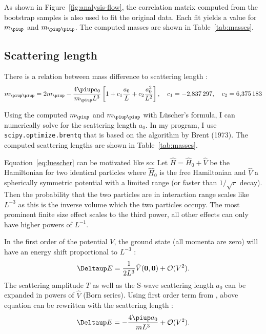 \documentclass[11pt, english, fleqn, DIV=10, headinclude]{scrartcl}
\newcommand\mpi{m_{\piup}}
\newcommand\mpipi{m_{\piup\piup}}
\begin{document}
As shown in Figure~\ref{fig:analysis-flow}, the correlation matrix computed from
the bootstrap samples is also used to fit the original data. Each fit yields a
value for $\mpi$ and $\mpipi$. The computed masses are shown in
Table~\ref{tab:masses}.

\subsection{Scattering length}
\label{sec:scattering_length}

There is a relation between mass difference to scattering length
\parencite[(1.3)]{luescher/volume_dependence}:
\begin{equation}
    \label{eq:luescher}
    \mpipi = 2\mpi - \frac{4 \piup a_0}{\mpi L^3} \sbr{1 + c_1 \frac{a_0}L + c_2 \frac{a_0^2}{L^2}}
    \eqnsep
    c_1 = \num{-2.837297}
    \eqnsep
    c_2 = \num{6.375183}
\end{equation}

Using the computed $\mpi$ and $\mpipi$ with Lüscher's formula, I can
numerically solve for the scattering length $a_0$. In my program, I use
\texttt{scipy.optimize.brentq} that is based on the algorithm by Brent (1973).
The computed scattering lengths are shown in Table~\ref{tab:masses}.

Equation~\eqref{eq:luescher} can be motivated like so: Let $\hat H = \hat H_0 +
\hat V$ be the Hamiltonian for two identical particles where $\hat H_0$ is the
free Hamiltonian and $\hat V$ a spherically symmetric potential with a limited
range (or faster than $1/\sqrt r$ decay). Then the probability that the two
particles are in interaction range scales like $L^{-3}$ as this is the inverse
volume which the two particles occupy. The most prominent finite size effect
scales to the third power, all other effects can only have higher powers of
$L^{-1}$.

In the first order of the potential $V$, the ground state (all momenta are zero)
will have an energy shift proportional to $L^{-3}$
\parencite[(2.24)]{luescher/volume_dependence}:
\[
    \Deltaup E = \frac{1}{2L^3} \hat V(\vec 0, \vec 0) + \mathcal O(V^2).
\]
The scattering amplitude $T$ as well as the S-wave scattering length $a_0$ can
be expanded in powers of $\hat V$ (Born series). Using first order term from
\parencite[(2.18)]{luescher/volume_dependence}, above equation can be rewritten
with the scattering length
\parencite[(2.25)]{luescher/volume_dependence}:
\[
    \Deltaup E = - \frac{4\piup a_0}{m L^3} + \mathcal O(V^2).
\]
\end{document}
